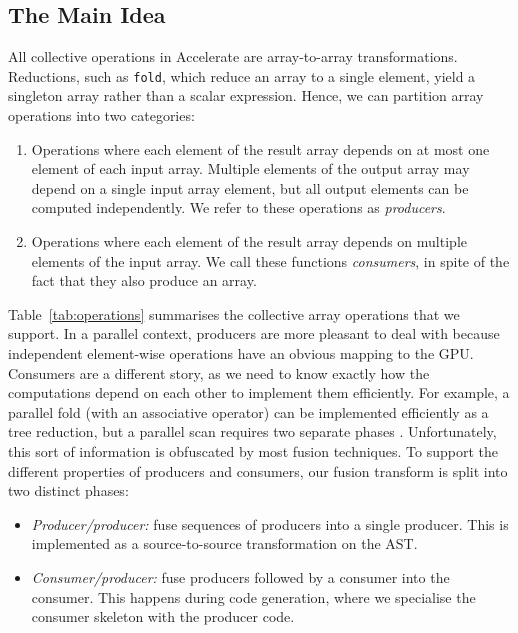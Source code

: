 \subsection{The Main Idea}
All collective operations in Accelerate are array-to-array transformations. Reductions, such as \texttt{fold}, which reduce an array to a single element, yield a singleton array rather than a scalar expression. Hence, we can partition array operations into two categories:
%
\begin{enumerate}
\item Operations where each element of the result array depends on at most one element of each input array. Multiple elements of the output array may depend on a single input array element, but all output elements can be computed independently. We refer to these operations as \textit{producers}.

\item Operations where each element of the result array depends on multiple elements of the input array. We call these functions \textit{consumers}, in spite of the fact that they also produce an array.
\end{enumerate}
%
Table~\ref{tab:operations} summarises the collective array operations that we support. In a parallel context, producers are more pleasant to deal with because independent element-wise operations have an obvious mapping to the GPU. Consumers are a different story, as we need to know exactly how the computations depend on each other to implement them efficiently. For example, a parallel fold (with an associative operator) can be implemented efficiently as a tree reduction, but a parallel scan requires two separate phases \cite{Sengupta:2007tc, Chatterjee:1990vj}. Unfortunately, this sort of information is obfuscated by most fusion techniques. To support the different properties of producers and consumers, our fusion transform is split into two distinct phases:
%
\begin{itemize}
\item \emph{Producer/producer:} fuse sequences of producers into a single producer. This is implemented as a source-to-source transformation on the AST.

\item \emph{Consumer/producer:} fuse producers followed by a consumer into the consumer. This happens during code generation, where we specialise the consumer skeleton with the producer code.
\end{itemize}
